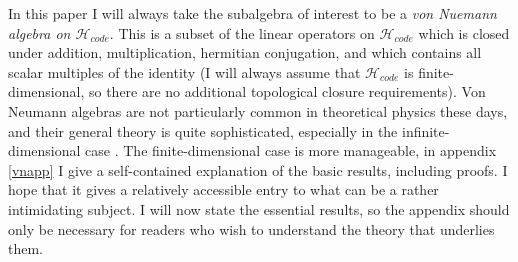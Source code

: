 \documentclass[12pt]{article}
\newcommand{\Hc}{\mathcal{H}_{code}}
\begin{document}
In this paper I will always take the subalgebra of interest to be a \textit{von Nuemann algebra on $\Hc$}.  This is a subset of the linear operators on $\Hc$ which is closed under addition, multiplication, hermitian conjugation, and which contains all scalar multiples of the identity (I will always assume that $\Hc$ is finite-dimensional, so there are no additional topological closure requirements). Von Neumann algebras are not particularly common in theoretical physics these days, and their general theory is quite sophisticated, especially in the infinite-dimensional case \cite{takesaki2003theory}.  The finite-dimensional case is more manageable, in appendix \ref{vnapp} I give a self-contained explanation of the basic results, including proofs.  I hope that it gives a relatively accessible entry to what can be a rather intimidating subject.  I will now state the essential results, so the appendix should only be necessary for readers who wish to understand the theory that underlies them.
\end{document}
